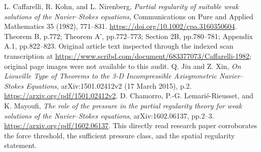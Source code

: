 
L. Caffarelli, R. Kohn, and L. Nirenberg,
\emph{Partial regularity of suitable weak solutions of the Navier--Stokes equations},
Communications on Pure and Applied Mathematics 35 (1982), 771--831.
\url{https://doi.org/10.1002/cpa.3160350604}.
Theorem B, p.772; Theorem A', pp.772--773; Section 2B, pp.780--781;
Appendix A.1, pp.822--823. Original article text inspected through the
indexed scan transcription at
\url{https://www.scribd.com/document/683377073/Caffarelli-1982};
original page images were not available to this audit.
Q. Jiu and Z. Xin,
\emph{On Liouville Type of Theorems to the 3-D Incompressible Axisymmetric
Navier--Stokes Equations}, arXiv:1501.02412v2 (17 March 2015), p.2.
\url{https://arxiv.org/pdf/1501.02412v2}.
D. Chamorro, P.-G. Lemari\'e-Rieusset, and K. Mayoufi,
\emph{The role of the pressure in the partial regularity theory for weak
solutions of the Navier--Stokes equations}, arXiv:1602.06137, pp.2--3.
\url{https://arxiv.org/pdf/1602.06137}.
This directly read research paper corroborates the force threshold,
the sufficient pressure class, and the spatial regularity statement.
